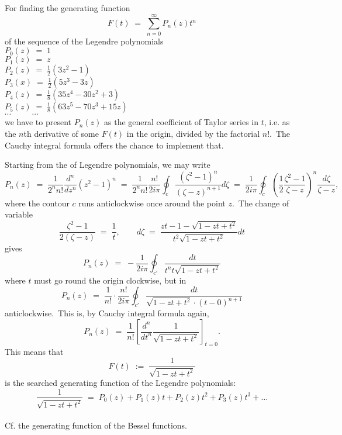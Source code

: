 \documentclass[12pt]{article}
\theoremstyle{definition}
\begin{document}
For finding the generating function 
$$F(t) \;=\; \sum_{n=0}^\infty P_n(z)t^n$$
of the sequence of the Legendre polynomials\\
$P_0(z) \;=\; 1$ \\
$P_1(z) \;=\; z$ \\
$P_2(z) \;=\; \frac{1}{2}(3z^2\!-\!1)$ \\
$P_3(x) \;=\; \frac{1}{2}(5z^3\!-\!3z)$ \\
$P_4(z) \;=\; \frac{1}{8}(35z^4\!-\!30z^2\!+\!3)$ \\
$P_5(z) \;=\; \frac{1}{8}(63z^5\!-\!70z^3\!+\!15z)$\\
$\cdots \qquad\;\; \cdots$\\
we have to present $P_n(z)$ as the general coefficient of Taylor series in $t$, 
i.e. as the $n$th derivative of some $F(t)$ in the origin, divided by the factorial $n!$.\, The Cauchy integral formula offers the chance to implement that.

Starting from the  of Legendre polynomials, we may write
$$P_n(z) \;=\; \frac{1}{2^nn!}\frac{d^n}{dz^n}(z^2\!-\!1)^n \;=\; 
\frac{1}{2^nn!}\frac{n!}{2i\pi}\oint_c\frac{(\zeta^2\!-\!1)^n}{(\zeta\!-\!z)^{n+1}}d\zeta\;=\; 
\frac{1}{2i\pi}\oint_c\left(\frac{1}{2}\frac{\zeta^2\!-\!1}{\zeta\!-\!z}\right)^n\!\frac{d\zeta}{\zeta\!-\!z},$$
where the contour $c$ runs anticlockwise once around the point $z$.\, The change of variable
$$\frac{\zeta^2\!-\!1}{2(\zeta\!-\!z)} \;=\; \frac{1}{t}, 
\qquad d\zeta \;=\; \frac{zt\!-\!1\!-\!\sqrt{1\!-\!zt\!+\!t^2}}{t^2\sqrt{1\!-\!zt\!+\!t^2}}dt$$
gives
$$P_n(z) \;=\; -\frac{1}{2i\pi}\oint_{c'}\frac{dt}{t^nt\sqrt{1\!-\!zt\!+\!t^2}}$$
where $t$ must go round the origin clockwise, but in
$$P_n(z) \;=\; \frac{1}{n!}\cdot\frac{n!}{2i\pi}\oint_{c'}\frac{dt}{\sqrt{1\!-\!zt\!+\!t^2}\cdot(t\!-\!0)^{n+1}}$$
anticlockwise.\, This is, by Cauchy integral formula again, 
$$P_n(z) \;=\; \frac{1}{n!}\left[\frac{d^n}{dt^n}\frac{1}{\sqrt{1\!-\!zt\!+\!t^2}}\right]_{t=0}.$$
This means that
$$F(t) \;:=\; \frac{1}{\sqrt{1\!-\!zt\!+\!t^2}}$$
is the searched generating function of the Legendre polynomials:
$$\frac{1}{\sqrt{1\!-\!zt\!+\!t^2}} \;=\; P_0(z)+P_1(z)t+P_2(z)t^2+P_3(z)t^3+\ldots$$\\


Cf. the generating function of the Bessel functions.


\end{document}
